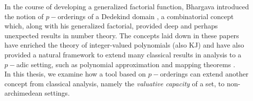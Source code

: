 
In the course of developing a generalized factorial function, Bhargava introduced the notion of $p-$orderings of a Dedekind domain \cite{mb1, mb2}, a combinatorial concept which, along with his generalized factorial, provided deep and perhaps unexpected results in number theory. The concepts laid down in these papers have enriched the theory of integer-valued polynomials \cite{mb3} (also KJ) and have also provided a natural framework to extend many classical results in analysis to a $p-$adic setting, such as polynomial approximation and mapping theorems \cite{mb1, mb2,mb3}.\\

In this thesis, we examine how a tool based on $p-$orderings can extend another concept from classical analysis, namely the \textit{valuative capacity} of a set, to non-archimedean settings.